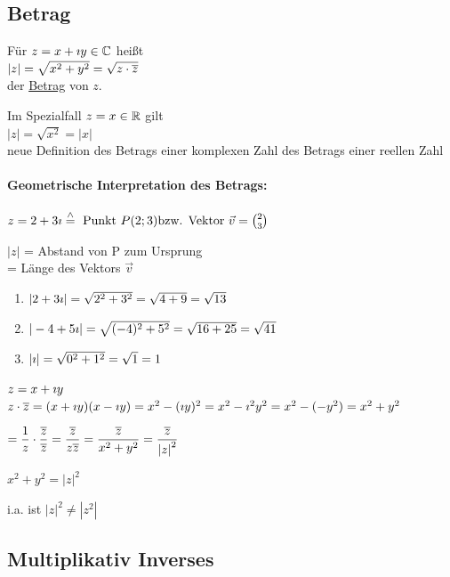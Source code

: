 \clearpage
\subsection{Betrag}

\Def Für $z=x+\imath y\in\mathbb{C}$ heißt\\
$|z| =\sqrt{x^2+y^2}=\sqrt{z\cdot \overline{z}}$\\
der \underline{Betrag} von $z$.

\Bem Im Spezialfall $z = x\in\mathbb{R}$ gilt\\
$|z| =\sqrt{x^2}=|x|$\\
neue Definition des Betrags einer komplexen Zahl  des Betrags einer reellen Zahl

\paragraph{Geometrische Interpretation des Betrags:}


$z=2+3\imath \stackrel{\wedge}{=}\text{ Punkt }P(2;3)\\
\text{bzw. Vektor }\vec{v}=\binom{2}{3}$

$|z|$ = Abstand von P zum Ursprung\\
= Länge des Vektors $\vec{v}$

\Bsps
\begin{enumerate}
	\item $|2+3\imath| = \sqrt{2^2+3^2} = \sqrt{4+9} = \sqrt{13}$
	\item $|-4+5\imath| = \sqrt{(-4)^2+5^2} = \sqrt{16+25} = \sqrt{41}$
	\item $|\imath| = \sqrt{0^2+1^2} = \sqrt{1} = 1$
\end{enumerate}

\Bem $z= x+\imath y$\\
$z\cdot \overline{z} =(x+\imath y)(x-\imath y)=x^2-(\imath y)^2 = x^2 -\imath^2y^2= x^2 -(-y^2)= x^2+y^2$

$=\dfrac{1}{z}\cdot\dfrac{\overline{z}}{\overline{z}}=\dfrac{\overline{z}}{z\overline{z}}=\dfrac{\overline{z}}{x^2+y^2}=\dfrac{\overline{z}}{{|z|}^2}$

$x^2+y^2={|z|}^2$

\Bem i.a. ist ${|z|}^2\neq|z^2|$


\clearpage
\subsection{Multiplikativ Inverses}


